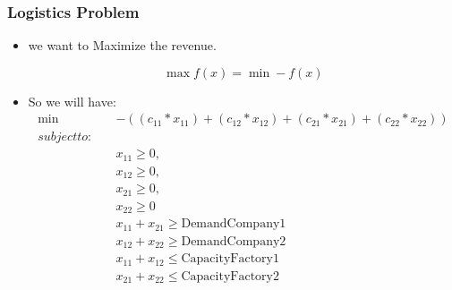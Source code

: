 \documentclass[presentation]{beamer}
\begin{document}
\begin{frame}
  \frametitle{Logistics Problem}
 \begin{itemize} 
  \item we want to Maximize the revenue.\\
  \begin{center}
  \begin{equation}
    \max f(x) =  \min - f(x)
  \end{equation}
  \end{center}

  \item So we will have:\\
  \begin{equation}
  \begin{align*}
    \min \quad&  -((c_{11} * x_{11}) + (c_{12} * x_{12}) + (c_{21} * x_{21}) + (c_{22} * x_{22}) )\\
     
    subject to: \quad&\\

    &x_{11} \geq 0,\\  
    &x_{12} \geq 0,\\   
    &x_{21} \geq 0,\\   
    & x_{22} \geq 0\\
    &x_{11}+x_{21} \geq \text{DemandCompany1}\\
    &x_{12}+x_{22} \geq \text{DemandCompany2}\\
    &x_{11}+x_{12} \leq \text{CapacityFactory1}\\
    &x_{21}+x_{22} \leq \text{CapacityFactory2}\\
    \end{align*}
  \end{equation}
  
  \end{itemize}
\end{frame}
\end{document}
